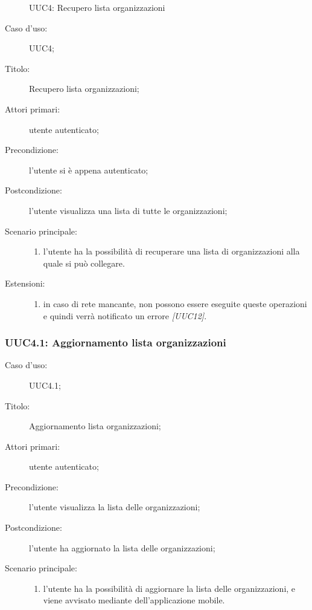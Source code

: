\documentclass[../../../analisi-dei-requisiti.tex]{subfiles}
\begin{document}
\begin{figure}[H]
  \centering
  \caption{UUC4: Recupero lista organizzazioni}%
  \label{fig:uuc4}
\end{figure}

\begin{description}
  \item[Caso d’uso:] UUC4;
  \item[Titolo:] Recupero lista organizzazioni;
  \item[Attori primari:] utente autenticato;
  \item[Precondizione:] l'utente si è appena autenticato;
  \item[Postcondizione:] l'utente visualizza una lista di tutte le organizzazioni;
  \item[Scenario principale:]
        \begin{enumerate}
          \item l'utente ha la possibilità di recuperare una lista di organizzazioni alla quale si può collegare.
        \end{enumerate}
  \item[Estensioni:]
        \begin{enumerate}
          \item in caso di rete mancante, non possono essere eseguite queste operazioni e quindi verrà notificato un errore \emph{[UUC12]}.
        \end{enumerate}
\end{description}


\subsubsection{UUC4.1: Aggiornamento lista organizzazioni}%
\label{subs:UUC4.1}
\begin{description}
  \item[Caso d’uso:] UUC4.1;
  \item[Titolo:] Aggiornamento lista organizzazioni;
  \item[Attori primari:] utente autenticato;
  \item[Precondizione:] l'utente visualizza la lista delle organizzazioni;
  \item[Postcondizione:] l'utente ha aggiornato la lista delle organizzazioni;
  \item[Scenario principale:]
        \begin{enumerate}
          \item l'utente ha la possibilità di aggiornare la lista delle organizzazioni, e viene avvisato mediante  dell'applicazione mobile.
        \end{enumerate}
\end{description}
\end{document}
